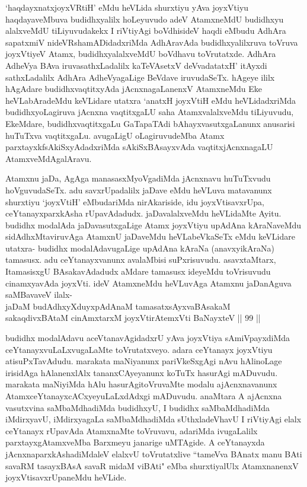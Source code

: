 \begin{artha}
`haqdayxnatxjoyxVRtiH' eMdu heVLida shurxtiyu yAva joyxVtiyu haqdayaveMbuva budidhxyalilx hoLeyuvudo adeV AtamxneMdU budidhxyu alalxveMdU tiLiyuvudakekx I riVtiyAgi boVdhisideV haqdi eMbudu AdhAra sapatxmiV nideVRshamADidadxriMda AdhAravAda budidhxyalilxruva toVruva joyxVtiyeV Atamx, budidhxyalalxveMdU boVdhavu toVrutatxde. AdhAra AdheVya BAva iruvasathxLadalilx kaTeVAsetxV deVvadatatxH' itAyxdi sathxLadalilx AdhAra AdheVyagaLige BeVdave iruvudaSeTx. hAgeye ililx hAgAdare budidhxvaqtitxyAda jAcnxnagaLanenxV AtamxneMdu Eke heVLabAradeMdu keVLidare utatxra `anatxH joyxVtiH eMdu heVLidadxriMda budidhxyoLagiruva jAcnxna vaqtitxgaLU saha AtamxvalalxveMdu tiLiyuvudu, EkeMdare, budidhxvaqtitxgaLu GaTapaTAdi bAhayxvasutxgaLanunx anusarisi huTuTxva vaqtitxgaLu. avugaLigU oLagiruvudeMba Atamx parxtayxkfsAkiSxyAdadxriMda sAkiSxBAsayxvAda vaqtitxjAcnxnagaLU AtamxveMdAgalAravu. 
\end{artha}


\begin{artha}
Atamxnu jaDa, AgAga manasasxMyoVgadiMda jAcnxnavu huTuTxvudu hoVguvudaSeTx. adu savxrUpadalilx jaDave eMdu heVLuva matavanunx shurxtiyu `joyxVtiH' eMbudariMda nirAkariside, idu joyxVtisavxrUpa, ceYtanayxparxkAsha rUpavAdadudx. jaDavalalxveMdu heVLidaMte Ayitu. budidhx modalAda jaDavasutxgaLige Atamx joyxVtiyu upAdAna kAraNaveMdu sidAdhxMtaviruvAga AtamxnU jaDaveMdu heVLabeVkaSeTx eMdu keVLidare utatxra- budidhx modalAdavugaLige upAdAna kAraNa (anavxyikAraNa) tamasusx. adu ceYtanayxvanunx avalaMbisi suPxrisuvudu. asavxtaMtarx, ItamasisxgU BAsakavAdadudx aMdare tamasusx ideyeMdu toVrisuvudu cinamxyavAda joyxVti. ideV AtamxneMdu heVLuvAga Atamxnu jaDanAguva saMBavaveV ilalx-\\
jaDaM budAdhxyXduyxpAdAnaM tamasatxsAyxvaBAsakaM\\
sakaqdivxBAtaM cinAmxtarxM joyxVtirAtemxVti BaNayxteV || 99 ||
\end{artha}

\begin{artha}
budidhx modalAdavu aceVtanavAgidadxrU yAva joyxVtiya sAmiVpayxdiMda ceYtanayxvuLaLxvugaLaMte toVrutatxveyo. adara ceYtanayx joyxVtiyu atisuPxTavAdudu. marakata maNiyanunx pariVkeSxgAgi nAvu hAlinoLage irisidAga hAlanenxlAlx tananxCAyeyanunx koTuTx hasurAgi mADuvudu. marakata maNiyiMda hAlu hasurAgitoVruvaMte modalu ajAcnxnavanunx AtamxceYtanayxcACxyeyuLaLxdAdxgi mADuvudu. anaMtara A ajAcnxna vasutxvina saMbaMdhadiMda budidhxyU, I budidhx saMbaMdhadiMda iMdirxyavU, iMdirxyagaLa saMbaMdhadiMda sUthxladeVhavU I riVtiyAgi elalx ceYtanayx rUpavAda AtamxnaMte toVruvavu, adariMda ivugaLalilx parxtayxgAtamxveMba Barxmeyu janarige uMTAgide. A ceYtanayxda jAcnxnaparxkAshadiMdaleV elalxvU toVrutatxlive ``tameVva BAnatx manu BAti savaRM tasayxBAsA savaR midaM viBAti" eMba shurxtiyalUlx AtamxnanenxV joyxVtisavxrUpaneMdu heVLide. 
\end{artha}


